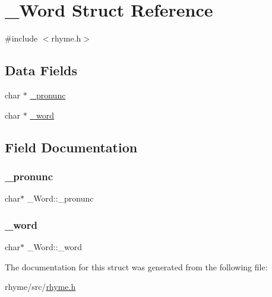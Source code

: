 \hypertarget{struct__Word}{}\section{\+\_\+\+Word Struct Reference}
\label{struct__Word}


{\ttfamily \#include $<$rhyme.\+h$>$}

\subsection*{Data Fields}
\begin{DoxyCompactItemize}
\item 
char $\ast$ \mbox{\hyperlink{struct__Word_ab090ace4849f621274b5e45de57efc99}{\+\_\+pronunc}}
\item 
char $\ast$ \mbox{\hyperlink{struct__Word_a59e9f91b2f07e506223b4bf52ee403c5}{\+\_\+word}}
\end{DoxyCompactItemize}


\subsection{Field Documentation}
\mbox{\label{struct__Word_ab090ace4849f621274b5e45de57efc99}} 
\subsubsection{\texorpdfstring{\+\_\+pronunc}{\_pronunc}}
{\footnotesize\ttfamily char$\ast$ \+\_\+\+Word\+::\+\_\+pronunc}

\mbox{\label{struct__Word_a59e9f91b2f07e506223b4bf52ee403c5}} 
\subsubsection{\texorpdfstring{\+\_\+word}{\_word}}
{\footnotesize\ttfamily char$\ast$ \+\_\+\+Word\+::\+\_\+word}



The documentation for this struct was generated from the following file\+:\begin{DoxyCompactItemize}
\item 
rhyme/src/\mbox{\hyperlink{rhyme_8h}{rhyme.\+h}}\end{DoxyCompactItemize}
